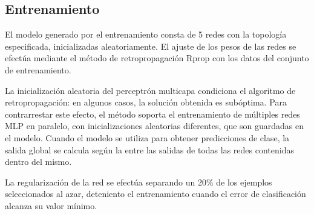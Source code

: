 %
\subsection{Entrenamiento}
%
El modelo generado por el entrenamiento consta de 5 redes con la
topología especificada, inicializadas aleatoriamente.
El ajuste de los pesos de las redes se efectúa mediante el método de
retropropagación Rprop con los datos del conjunto de entrenamiento.

La inicialización aleatoria del perceptrón multicapa condiciona el
algoritmo de retropropagación: en algunos casos, la solución obtenida
es subóptima.
Para contrarrestar este efecto, el método soporta el entrenamiento de
múltiples redes MLP en paralelo, con inicializaciones aleatorias
diferentes, que son guardadas en el modelo.
Cuando el modelo se utiliza para obtener predicciones de clase, la
salida global se calcula según la  entre las salidas de todas
las redes contenidas dentro del mismo.

La regularización de la red se efectúa separando un 20\% de los
ejemplos seleccionados al azar, deteniento el entrenamiento cuando el
error de clasificación alcanza su valor mínimo.
